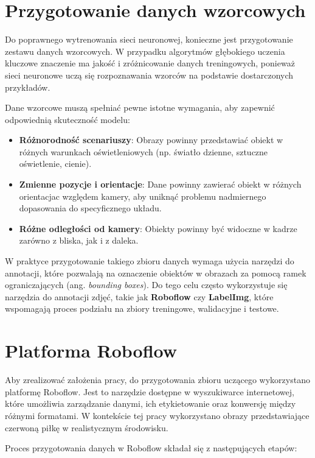 \documentclass[a4paper,twoside,12pt]{book}
\begin{document}
\section{Przygotowanie danych wzorcowych}
Do poprawnego wytrenowania sieci neuronowej, konieczne jest przygotowanie zestawu danych wzorcowych. W przypadku algorytmów głębokiego uczenia kluczowe znaczenie ma jakość i zróżnicowanie danych treningowych, ponieważ sieci neuronowe uczą się rozpoznawania wzorców na podstawie dostarczonych przykładów. 

Dane wzorcowe muszą spełniać pewne istotne wymagania, aby zapewnić odpowiednią skuteczność modelu:
\begin{itemize}
    \item \textbf{Różnorodność scenariuszy}: Obrazy powinny przedstawiać obiekt w różnych warunkach oświetleniowych (np. światło dzienne, sztuczne oświetlenie, cienie).
    \item \textbf{Zmienne pozycje i orientacje}: Dane powinny zawierać obiekt w różnych orientacjac względem kamery, aby uniknąć problemu nadmiernego dopasowania do specyficznego układu.
    \item \textbf{Różne odległości od kamery}: Obiekty powinny być widoczne w kadrze zarówno z bliska, jak i z daleka.
\end{itemize}

\newpage

W praktyce przygotowanie takiego zbioru danych wymaga użycia narzędzi do annotacji, które pozwalają na oznaczenie obiektów w obrazach za pomocą ramek ograniczających (ang. \textit{bounding boxes}). Do tego celu często wykorzystuje się narzędzia do annotacji zdjęć, takie jak \textbf{Roboflow} czy \textbf{LabelImg}, które wspomagają proces podziału na zbiory treningowe, walidacyjne i testowe.


\section{Platforma Roboflow}
Aby zrealizować założenia pracy, do przygotowania zbioru uczącego wykorzystano platformę Roboflow. Jest to narzędzie dostępne w wyszukiwarce internetowej, które umożliwia zarządzanie danymi, ich etykietowanie oraz konwersję między różnymi formatami. W kontekście tej pracy wykorzystano obrazy przedstawiające czerwoną piłkę w realistycznym środowisku.

Proces przygotowania danych w Roboflow składał się z następujących etapów:
\end{document}
